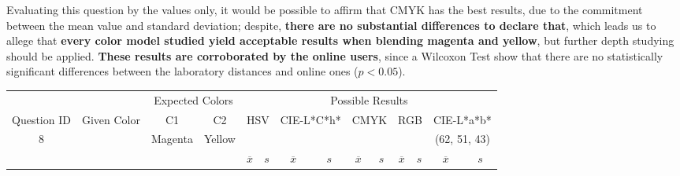 %
Evaluating this question by the values only, it would be possible to affirm that CMYK has the best results, due to the commitment between the mean value and standard deviation; despite,
\textbf{there are no substantial differences to declare that}, which leads us to allege that \textbf{every color model studied yield acceptable results when blending magenta and yellow},
but further depth studying should be applied. \textbf{These results are corroborated by the online users}, since a Wilcoxon Test show that there are no statistically significant differences
between the laboratory distances and online ones ($p < 0.05$).
%
\begin{table}[H]
  \resizebox{\textwidth}{!} {
  \begin{tabular}{lccccccccccccc}
    \hline
    \multicolumn{1}{c}{}                              &                                      & \multicolumn{2}{c}{Expected Colors}                   & \multicolumn{10}{c}{Possible Results}                                                                                                                                                                                                                                                                                        \\ \cline{3-14}
    \multicolumn{1}{c}{\multirow{-2}{*}{Question ID}} & \multirow{-2}{*}{Given Color}        & C1                       & C2                         & \multicolumn{2}{c}{HSV}                                        & \multicolumn{2}{c}{CIE-L*C*h*}                                 & \multicolumn{2}{c}{CMYK}                                       & \multicolumn{2}{c}{RGB}                                        & \multicolumn{2}{c}{CIE-L*a*b*}                                 \\ \hline
    \multicolumn{1}{c}{8}                             & \cellcolor[HTML]{FF0000}{\color[HTML]{FFFFFF}(41, 21, 2)} & \multicolumn{1}{c|}{Magenta} & \multicolumn{1}{c|}{Yellow}  & \multicolumn{2}{c|}{\cellcolor[HTML]{FF0000}{\color[HTML]{FFFFFF}(41, 21, 2)}}      & \multicolumn{2}{c|}{\cellcolor[HTML]{FF6755}{\color[HTML]{FFFFFF}(48, 32, 12)}}       & \multicolumn{2}{c|}{\cellcolor[HTML]{FF8080}{\color[HTML]{FFFFFF}(53, 38, 25)}}       & \multicolumn{2}{c|}{\cellcolor[HTML]{FF8080}{\color[HTML]{FFFFFF}(53, 38, 25)}}       & \multicolumn{2}{c|}{\cellcolor[HTML]{FFA6A6}(62, 51, 43)}       \\ \hline
                                                      & \multicolumn{1}{l}{}                 & \multicolumn{1}{l}{}     & \multicolumn{1}{l}{}       & \multicolumn{1}{c}{$\overline{x}$} & \multicolumn{1}{c}{$s$} & \multicolumn{1}{c}{$\overline{x}$} & \multicolumn{1}{c}{$s$} & \multicolumn{1}{c}{$\overline{x}$} & \multicolumn{1}{c}{$s$} & \multicolumn{1}{c}{$\overline{x}$} & \multicolumn{1}{c}{$s$} & \multicolumn{1}{c}{$\overline{x}$} & \multicolumn{1}{c}{$s$} \\ \hline

\end{tabular}}
\end{table}

